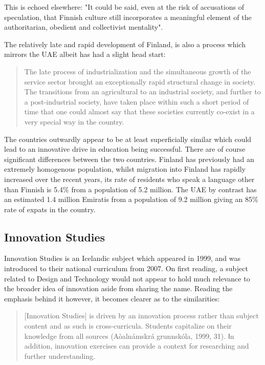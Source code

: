 This is echoed elsewhere: "It could be said, even at the risk of accusations of speculation, that Finnish culture still incorporates a meaningful element of the authoritarian, obedient and collectivist mentality". \cite{Simola2005}

The relatively late and rapid development of Finland, is also a process which mirrors the UAE albeit has had a slight head start:

\begin{quote}
The late process of industrialization and the simultaneous growth of the service sector brought an exceptionally rapid structural change in society. The transitions from an agricultural to an industrial society, and further to a post-industrial society, have taken place within such a short period of time that one could almost say that these societies currently co-exist in a very special way in the country.
\end{quote} \cite{Simola2005}

The countries outwardly appear to be at least superficially similar which could lead to an innovative drive in education being successful. There are of course significant differences between the two countries. Finland has previously had an extremely homogenous population, whilst migration into Finland has rapidly increased over the recent years, its rate of residents who speak a language other than Finnish is 5.4\% from a population of 5.2 million. \cite{OfficialStatisticsofFinlandOSF2011} The UAE by contrast has an estimated 1.4 million Emiratis \cite{HABBOUSH2013}from a population of 9.2 million \cite{MalitJr.2013} giving an 85\% rate of expats in the country.

\subsection{Innovation Studies}
Innovation Studies is an Icelandic subject which appeared in 1999, and was introduced to their national curriculum from 2007. On first reading, a subject related to Design and Technology would not appear to hold much relevance to the broader idea of innovation aside from sharing the name. Reading the emphasis behind it however, it becomes clearer as to the similarities:
\begin{quote}
[Innovation Studies] is driven by an innovation process rather than subject content and as such is cross-curricula. Students capitalize on their knowledge from all sources (Aòalnámskrá grunnskóla, 1999, 31). Ⅰn addition, innovation exercises can provide a context for researching and further understanding.
\end{quote} \cite{thorsteinsson2005innovation}

